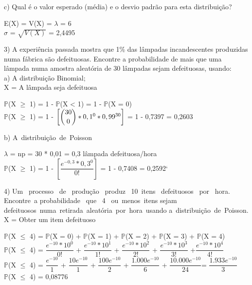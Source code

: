 \documentclass[12pt,a4paper]{article}
\begin{document}
	\vspace{1cm}
	c) Qual é o valor esperado (média) e o desvio padrão para esta distribuição?
	\begin{center}
		\vspace{0.5cm}
		E(X) = V(X) = $\lambda$ = 6
		\vspace{1cm}\\
		$\sigma$ = $\sqrt{V(X)}$ = 2,4495
	\end{center}
	\vspace{1cm}
	3) A experiência passada mostra que 1\% das lâmpadas incandescentes produzidas numa fábrica são defeituosas. Encontre a probabilidade de mais que uma lâmpada numa amostra aleatória de 30 lâmpadas sejam defeituosas, usando:\\
	a) A distribuição Binomial;
	\vspace{0.5cm}\\
	X = A lâmpada seja defeituosa
	\begin{center}
		\vspace{0.5cm}
		$\mathbb{P}$(X $\geq$ 1) = 1 - $\mathbb{P}$(X < 1) =  1 - $\mathbb{P}$(X = 0)
		\vspace{0.5cm}\\
		$\mathbb{P}$(X $\geq$ 1) = 1 - $\left[\dbinom{30}{0} * 0,1^{0} * 0,99^{30}\right]$ = 1 - 0,7397 = 0,2603
	\end{center}
	\vspace{1cm}
	b) A distribuição de Poisson
	\begin{center}
		\vspace{0.5cm}
		$\lambda$ = np = 30 * 0,01 = 0,3 lâmpada defeituosa/hora
		\vspace{1cm}\\
		$\mathbb{P}$(X $\geq$ 1) = 1 - $\left[\dfrac{e^{-0,3} * 0,3^{0}}{0!}\right]$ = 1 - 0,7408 = 0,2592`
	\end{center}
	\vspace{1cm}
	4) Um  processo  de  produção  produz  10 itens  defeituosos  por  hora.  Encontre a probabilidade  que  4  ou menos itens sejam defeituosos numa retirada aleatória por hora usando a distribuição de Poisson.
	\vspace{0.5cm}\\
	X = Obter um item defeituoso
	\begin{center}
		\vspace{0.5cm}
		$\mathbb{P}$(X $\leq$ 4) = $\mathbb{P}$(X = 0) + $\mathbb{P}$(X = 1) + $\mathbb{P}$(X = 2) + $\mathbb{P}$(X = 3) + $\mathbb{P}$(X = 4)
		\vspace{0.5cm}\\
		$\mathbb{P}$(X $\leq$ 4) = $\dfrac{e^{-10} * 10^{0}}{0!}$ + $\dfrac{e^{-10} * 10^{1}}{1!}$ + $\dfrac{e^{-10} * 10^{2}}{2!}$ + $\dfrac{e^{-10} * 10^{3}}{3!}$ +$\dfrac{e^{-10} * 10^{4}}{4!}$
		\vspace{0.5cm}\\
		$\mathbb{P}$(X $\leq$ 4) = $\dfrac{e^{-10}}{1}$ + $\dfrac{10e^{-10}}{1}$ + $\dfrac{100e^{-10}}{2}$ + $\dfrac{1.000e^{-10}}{6}$ + $\dfrac{10.000e^{-10}}{24}$= $\dfrac{1.933e^{-10}}{3}$
		\vspace{0.5cm}\\
		$\mathbb{P}$(X $\leq$ 4) = 0,08776
	\end{center}
\end{document}
